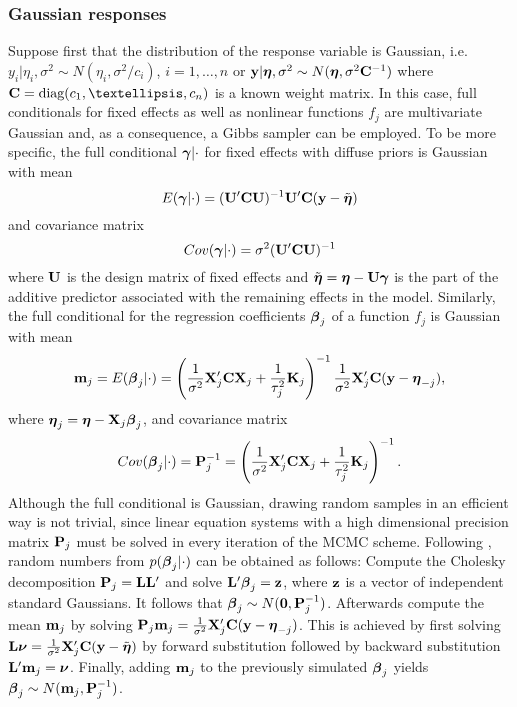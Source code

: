 \documentclass[11pt,a4paper,twoside]{bayesxarticle}
\begin{document}
\subsubsection{Gaussian responses}
\label{gaussianresp} 

Suppose first that the distribution of the response variable is
Gaussian, i.e. $y_i | \eta_i, \sigma^2 \sim N(\eta_i,\sigma^2/c_i)$,
$i=1,\dots,n$ or $\mathbf{y} | \boldsymbol{\eta}, \sigma^2 \sim N(\boldsymbol{\eta},\sigma^2 \mathbf{C}^{-1})$
where $\Cvec = \diag(c_1,\dots,c_n)$ is a known weight matrix. In this
case, full conditionals for fixed effects as well as nonlinear
functions $f_j$ are multivariate Gaussian and, as a consequence, a
Gibbs sampler can be employed. To be more specific, the full
conditional $\boldsymbol{\gamma} | \cdot$ for fixed effects with diffuse priors
is Gaussian with mean
\begin{equation}\label{meanfixed}
 E(\gammavec | \cdot) = (\Uvec'\Cvec  \Uvec)^{-1}\Uvec'\Cvec(\yvec-\tilde{\etavec})
\end{equation}
and covariance matrix
\begin{equation}
\label{covfixed} Cov(\gammavec | \cdot ) = \sigma^2 (\Uvec'\Cvec \Uvec)^{-1}
\end{equation}
where $\mathbf{U}$ is the design matrix of fixed effects and
$\tilde{\boldsymbol{\eta}}=\boldsymbol{\eta}-\mathbf{U} \boldsymbol{\gamma}$ is the part of the additive predictor
associated with the remaining effects in the model. Similarly, the
full conditional for the regression coefficients $\boldsymbol{\beta}_j$ of a
function $f_j$ is Gaussian with mean
\begin{equation}
\label{meangaussian} \mvec_j = E(\betavec_j | \cdot) = \left(
\frac{1}{\sigma^2} \Xvec_j' \Cvec \Xvec_j + \frac{1}{\tau_j^2} \Kvec_j \right)^{-1}
\frac{1}{\sigma^2}\Xvec_j' \Cvec(\yvec-\etavec_{-j}),
\end{equation}
where $\boldsymbol{\eta}_j=\boldsymbol{\eta}-\mathbf{X}_j\boldsymbol{\beta}_j$, and covariance matrix
\begin{equation}
\label{covgaussian} Cov(\betavec_j | \cdot) = \Pvec_j^{-1} = \left(
\frac{1}{\sigma^2} \Xvec_j' \Cvec \Xvec_j + \frac{1}{\tau_j^2} \Kvec_j \right)^{-1}.
\end{equation}
Although the full conditional is Gaussian, drawing random samples in an efficient way is not trivial, since linear equation
systems with a high dimensional precision matrix $\mathbf{P}_j$ must be solved in every iteration of the MCMC scheme. Following
, random numbers from $p(\boldsymbol{\beta}_j | \cdot)$ can be obtained as follows: Compute the Cholesky decomposition
$\mathbf{P}_j = \mathbf{L} \mathbf{L}'$ and solve $\mathbf{L}' \boldsymbol{\beta}_j = \mathbf{z}$, where $\mathbf{z}$ is a vector of independent standard Gaussians. It
follows that $\boldsymbol{\beta}_j \sim N(\boldsymbol{0},\mathbf{P}_j^{-1})$. Afterwards compute the mean $\mathbf{m}_j$ by solving $\mathbf{P}_j \mathbf{m}_j =
\frac{1}{\sigma^2} \mathbf{X}_j'\mathbf{C}(\mathbf{y}-\boldsymbol{\eta}_{-j})$. This is achieved by first solving $\mathbf{L} \boldsymbol{\nu} = \frac{1}{\sigma^2}
\mathbf{X}_j'\mathbf{C}(\mathbf{y}-\tilde{\boldsymbol{\eta}})$ by forward substitution followed by backward substitution $\mathbf{L}' \mathbf{m}_j = \boldsymbol{\nu}$.
Finally, adding $\mathbf{m}_j$ to the previously simulated $\boldsymbol{\beta}_j$ yields $\boldsymbol{\beta}_j \sim N(\mathbf{m}_j,\mathbf{P}_j^{-1})$.
\end{document}
